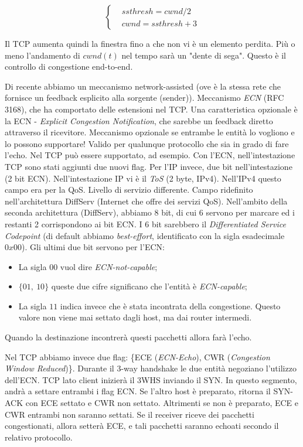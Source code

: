 \[
	\left\{
	\begin{aligned}
	&ssthresh = cwnd/2\\
	&cwnd = ssthresh + 3
	\end{aligned}
	\right.
\]

Il TCP aumenta quindi la finestra fino a che non vi è un elemento perdita. Più o meno l'andamento di $cwnd(t)$ nel tempo sarà un "dente di sega". Questo è il controllo di congestione end-to-end.

Di recente abbiamo un meccanismo network-assisted (ove è la stessa rete che fornisce un feedback esplicito alla sorgente (sender)). Meccanismo \textit{ECN} (RFC 3168), che ha comportato delle estensioni nel TCP. Una caratteristica opzionale è la ECN - \textit{Explicit Congestion Notification}, che sarebbe un feedback diretto attraverso il ricevitore. Meccanismo opzionale se entrambe le entità lo vogliono e lo possono supportare! Valido per qualunque protocollo che sia in grado di fare l'echo. Nel TCP può essere supportato, ad esempio. Con l'ECN, nell'intestazione TCP sono stati aggiunti due nuovi flag. Per l'IP invece, due bit nell'intestazione (2 bit ECN). Nell'intestazione IP vi è il \textit{ToS} (2 byte, IPv4). Nell'IPv4 questo campo era per la QoS. Livello di servizio differente. Campo ridefinito nell'architettura DiffServ (Internet che offre dei servizi QoS). Nell'ambito della seconda architettura (DiffServ), abbiamo 8 bit, di cui 6 servono per marcare ed i restanti 2 corrispondono ai bit ECN. I 6 bit sarebbero il \textit{Differentiated Service Codepoint} (di default abbiamo \textit{best-effort}, identificato con la sigla esadecimale $0x00$).
Gli ultimi due bit servono per l'ECN:

\begin{itemize}
\item La sigla $00$ vuol dire \textit{ECN-not-capable};
\item $\{01,\ 10\}$ queste due cifre significano che l'entità è \textit{ECN-capable};
\item La sigla $11$ indica invece che è stata incontrata della congestione. Questo valore non viene mai settato dagli host, ma dai router intermedi.
\end{itemize}

Quando la destinazione incontrerà questi pacchetti allora farà l'echo.

Nel TCP abbiamo invece due flag: \{ECE (\textit{ECN-Echo}), CWR (\textit{Congestion Window Reduced})\}. Durante il 3-way handshake le due entità negoziano l'utilizzo dell'ECN. TCP lato client inizierà il 3WHS inviando il SYN. In questo segmento, andrà a settare entrambi i flag ECN. Se l'altro host è preparato, ritorna il SYN-ACK con ECE settato e CWR non settato. Altrimenti se non è preparato, ECE e CWR entrambi non saranno settati. Se il receiver riceve dei pacchetti congestionati, allora setterà ECE, e tali pacchetti saranno echoati secondo il relativo protocollo.

